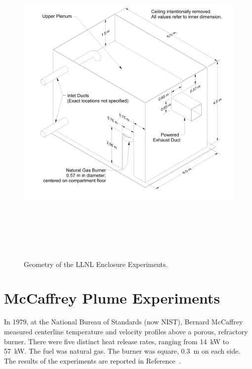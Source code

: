 \begin{figure}
\begin{center}
\includegraphics[height=6.5in]{FIGURES/LLNL_Enclosure/LLNL_Enclosure_Drawing}
\end{center}
\caption{Geometry of the LLNL Enclosure Experiments.}
\label{LLNL_Enclosure_Drawing}
\end{figure}


\section{McCaffrey Plume Experiments}

In 1979, at the National Bureau of Standards (now NIST), Bernard McCaffrey measured centerline temperature and velocity profiles above a porous, refractory burner.
There were five distinct heat release rates, ranging from 14~kW to 57~kW. The fuel was natural gas. The burner was square, 0.3~m on each side.
The results of the experiments are reported in Reference~\cite{McCaffrey:NBSIR_79-1910}.


